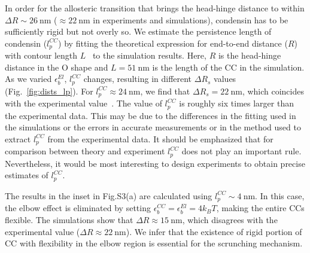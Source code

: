 \documentclass[aps,preprint]{revtex4-1}
\newcommand{\nm}{\ \mathrm{nm}}
\begin{document}
In order for the allosteric transition that brings the head-hinge distance to within $\Delta R\sim 26\nm$ ($\approx 22\nm$ in experiments and simulations), condensin has to be sufficiently rigid but not overly so. %
We estimate the persistence length of condensin ($l^{CC}_p$) by fitting the theoretical expression for end-to-end distance ($R$) with contour length $L$~\cite{bhattacharjee1997distribution} to the simulation results. Here, $R$ is the head-hinge distance in the O shape and $L=51\nm$ is the length of the CC in the simulation. %
As we varied $\epsilon_b^{El}$, $l_p^{CC}$ changes, resulting in different $\Delta R_s$ values (Fig.~\ref{fig:dists_lp}). 
For $l_p^{CC} \approx 24 \nm $, we find that  $\Delta R_s=22\nm$, which coincides with the experimental value~\cite{ryu2020condensin}.  
The value of $l_p^{CC}$ is roughly six times larger than the experimental data. This may be due to the differences in the fitting used in the simulations or the errors in accurate measurements or in the method used to extract $l_p^{CC}$ from the experimental data. It should be emphasized that for comparison between theory and experiment $l_p^{CC}$ does not play an important rule. Nevertheless, it would be most interesting to design experiments to obtain precise estimates of $l_p^{CC}$.

The results in the inset in Fig.S3(a) are calculated using $l_p^{CC} \sim 4 \nm$. In this case, the elbow effect  is eliminated by setting $\epsilon^{CC}_b  = \epsilon^{El}_b =4 k_BT$, making  the entire CCs flexible. The simulations show that $\Delta R \approx 15\nm $, which disagrees with the experimental value ($\Delta R \approx 22\nm $).   We infer that  the existence of rigid portion of CC with flexibility in the elbow region  is essential for the scrunching mechanism. 
\end{document}
